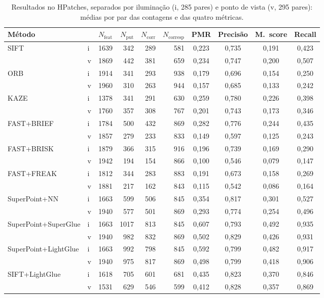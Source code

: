 \documentclass[11pt,a4paper]{article}
\begin{document}
\begin{table}[H]
\centering\small
\caption{Resultados no HPatches, separados por iluminação (i, 285 pares) e ponto de vista (v, 295 pares):
médias por par das contagens e das quatro métricas.}
\label{tab:hpatches}
\begin{tabular}{llrrrrcccc}
\toprule
Método & & $N_\text{feat}$ & $N_\text{put}$ & $N_\text{corr}$ & $N_\text{corresp}$ & PMR & Precisão & M.~score & Recall \\
\midrule
\multirow{2}{*}{SIFT} & i & 1639 & 342 & 289 & 581 & 0,223 & 0,735 & 0,191 & 0,423 \\
 & v & 1869 & 442 & 381 & 659 & 0,234 & 0,747 & 0,200 & 0,507 \\
\multirow{2}{*}{ORB} & i & 1914 & 341 & 293 & 938 & 0,179 & 0,696 & 0,154 & 0,250 \\
 & v & 1960 & 310 & 263 & 944 & 0,157 & 0,685 & 0,133 & 0,242 \\
\multirow{2}{*}{KAZE} & i & 1378 & 341 & 291 & 630 & 0,259 & 0,780 & 0,226 & 0,398 \\
 & v & 1760 & 357 & 308 & 767 & 0,201 & 0,743 & 0,173 & 0,346 \\
\multirow{2}{*}{FAST+BRIEF} & i & 1784 & 500 & 432 & 869 & 0,282 & 0,776 & 0,244 & 0,435 \\
 & v & 1857 & 279 & 233 & 833 & 0,149 & 0,597 & 0,125 & 0,243 \\
\multirow{2}{*}{FAST+BRISK} & i & 1879 & 366 & 315 & 916 & 0,196 & 0,739 & 0,169 & 0,290 \\
 & v & 1942 & 194 & 154 & 866 & 0,100 & 0,546 & 0,079 & 0,147 \\
\multirow{2}{*}{FAST+FREAK} & i & 1812 & 344 & 283 & 883 & 0,191 & 0,673 & 0,158 & 0,269 \\
 & v & 1881 & 217 & 162 & 843 & 0,115 & 0,542 & 0,086 & 0,164 \\
\midrule
\multirow{2}{*}{SuperPoint+NN} & i & 1663 & 599 & 506 & 845 & 0,354 & 0,817 & 0,301 & 0,527 \\
 & v & 1940 & 577 & 501 & 869 & 0,293 & 0,774 & 0,254 & 0,496 \\
\multirow{2}{*}{SuperPoint+SuperGlue} & i & 1663 & 1017 & 813 & 845 & 0,607 & 0,793 & 0,492 & 0,935 \\
 & v & 1940 & 982 & 832 & 869 & 0,502 & 0,829 & 0,426 & 0,931 \\
\multirow{2}{*}{SuperPoint+LightGlue} & i & 1663 & 992 & 798 & 845 & 0,592 & 0,799 & 0,482 & 0,917 \\
 & v & 1940 & 975 & 817 & 869 & 0,498 & 0,799 & 0,418 & 0,906 \\
\multirow{2}{*}{SIFT+LightGlue} & i & 1618 & 705 & 601 & 681 & 0,435 & 0,823 & 0,370 & 0,846 \\
 & v & 1531 & 629 & 546 & 599 & 0,412 & 0,828 & 0,357 & 0,869 \\
\bottomrule
\end{tabular}
\end{table}
\end{document}
